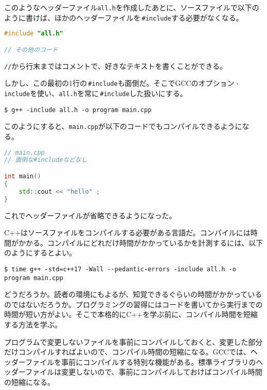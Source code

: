 このようなヘッダーファイル\texttt{all.h}を作成したあとに、ソースファイルで以下のように書けば、ほかのヘッダーファイルを\,\texttt{\#include}する必要がなくなる。

\ifTombow\pagebreak\fi
\begin{lstlisting}[language={C++}]
#include "all.h"

// その他のコード
\end{lstlisting}

\texttt{//}から行末まではコメントで、好きなテキストを書くことができる。

しかし、この最初の1行の\,\texttt{\#include}も面倒だ。そこでGCCのオプション\,\texttt{-include}を使い、\texttt{all.h}を常に\,\texttt{\#include}した扱いにする。

\begin{lstlisting}[style=terminal]
$ g++ -include all.h -o program main.cpp
\end{lstlisting}

このようにすると、\texttt{main.cpp}が以下のコードでもコンパイルできるようになる。

\begin{lstlisting}[language={C++}]
// main.cpp
// 面倒な#includeなどなし

int main()
{
    std::cout << "hello" ;
}
\end{lstlisting}

これでヘッダーファイルが省略できるようになった。


C++はソースファイルをコンパイルする必要がある言語だ。コンパイルには時間がかかる。コンパイルにどれだけ時間がかかっているかを計測するには、以下のようにするとよい。

\begin{lstlisting}[style=terminal]
$ time g++ -std=c++17 -Wall --pedantic-errors -include all.h -o program main.cpp
\end{lstlisting}

どうだろうか。読者の環境にもよるが、知覚できるぐらいの時間がかかっているのではないだろうか。プログラミングの習得にはコードを書いてから実行までの時間が短い方がよい。そこで本格的にC++を学ぶ前に、コンパイル時間を短縮する方法を学ぶ。

プログラムで変更しないファイルを事前にコンパイルしておくと、変更した部分だけコンパイルすればよいので、コンパイル時間の短縮になる。GCCでは、ヘッダーファイルを事前にコンパイルする特別な機能がある。標準ライブラリのヘッダーファイルは変更しないので、事前にコンパイルしておけばコンパイル時間の短縮になる。

